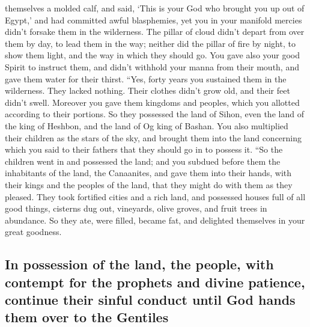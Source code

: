 themselves a molded calf, and said, `This is your God who brought you up
out of Egypt,' and had committed awful blasphemies,  yet
you in your manifold mercies didn't forsake them in the wilderness. The
pillar of cloud didn't depart from over them by day, to lead them in the
way; neither did the pillar of fire by night, to show them light, and
the way in which they should go.  You gave also your good
Spirit to instruct them, and didn't withhold your manna from their
mouth, and gave them water for their thirst.  ``Yes,
forty years you sustained them in the wilderness. They lacked nothing.
Their clothes didn't grow old, and their feet didn't swell.
 Moreover you gave them kingdoms and peoples, which you
allotted according to their portions. So they possessed the land of
Sihon, even the land of the king of Heshbon, and the land of Og king of
Bashan.  You also multiplied their children as the stars
of the sky, and brought them into the land concerning which you said to
their fathers that they should go in to possess it.  ``So
the children went in and possessed the land; and you subdued before them
the inhabitants of the land, the Canaanites, and gave them into their
hands, with their kings and the peoples of the land, that they might do
with them as they pleased.  They took fortified cities
and a rich land, and possessed houses full of all good things, cisterns
dug out, vineyards, olive groves, and fruit trees in abundance. So they
ate, were filled, became fat, and delighted themselves in your great
goodness.

\hypertarget{in-possession-of-the-land-the-people-with-contempt-for-the-prophets-and-divine-patience-continue-their-sinful-conduct-until-god-hands-them-over-to-the-gentiles}{%
\subsection{In possession of the land, the people, with contempt for the
prophets and divine patience, continue their sinful conduct until God
hands them over to the
Gentiles}\label{in-possession-of-the-land-the-people-with-contempt-for-the-prophets-and-divine-patience-continue-their-sinful-conduct-until-god-hands-them-over-to-the-gentiles}}

